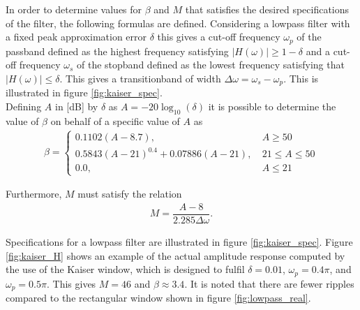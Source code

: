In order to determine values for $\beta$ and $M$ that satisfies the desired specifications of the filter, the following formulas are defined. Considering a lowpass filter with a fixed peak approximation error $\delta$ this gives a cut-off frequency $\omega_p$ of the passband defined as the highest frequency satisfying $|H(\omega)| \geq 1-\delta$ and a cut-off frequency $\omega_s$ of the stopband defined as the lowest frequency satisfying that $|H(\omega)| \leq \delta$. This gives a transitionband of width $\Delta \omega = \omega_s - \omega_p$. This is illustrated in figure \ref{fig:kaiser_spec}.
\\
Defining $A$ in [dB] by $\delta$ as $A = -20\log_{10} (\delta)$ it is possible to determine the value of $\beta$ on behalf of a specific value of $A$ as \cite{page 566, DTSP}
\begin{align*}
\beta =
\begin{cases}
0.1102\left( A-8.7 \right), &\ A \geq 50 \\
0.5843\left(A-21\right)^{0.4}+0.07886(A-21), &\ 21 \leq A \leq 50 \\
0.0, &\  A \leq 21 
\end{cases}
\end{align*}
       
Furthermore, $M$ must satisfy the relation
\begin{align}
M = \dfrac{A-8}{2.285\Delta \omega}.
\end{align}

Specifications for a lowpass filter are illustrated in figure \ref{fig:kaiser_spec}. Figure \ref{fig:kaiser_H} shows an example of the actual amplitude response computed by the use of the Kaiser window, which is designed to fulfil $\delta=0.01$, $\omega_p = 0.4\pi$, and $\omega_p = 0.5\pi$. This gives $M=46$ and $\beta \approx 3.4$. It is noted that there are fewer ripples compared to the rectangular window shown in figure \ref{fig:lowpass_real}.

